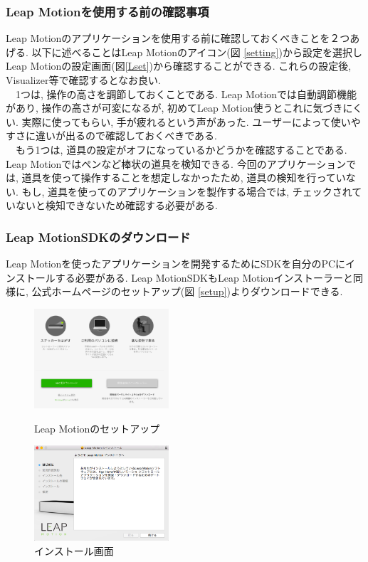 \documentclass{funthesis}
\begin{document}
\subsubsection{Leap Motionを使用する前の確認事項}
Leap Motionのアプリケーションを使用する前に確認しておくべきことを２つあげる. 以下に述べることはLeap Motionのアイコン(図 \ref{setting})から設定を選択しLeap Motionの設定画面(図\ref{Lset})から確認することができる. これらの設定後, Visualizer等で確認するとなお良い. \\
　1つは, 操作の高さを調節しておくことである. Leap Motionでは自動調節機能があり, 操作の高さが可変になるが, 初めてLeap Motion使うとこれに気づきにくい. 実際に使ってもらい, 手が疲れるという声があった. ユーザーによって使いやすさに違いが出るので確認しておくべきである. \\
　もう1つは, 道具の設定がオフになっているかどうかを確認することである. Leap Motionではペンなど棒状の道具を検知できる. 今回のアプリケーションでは, 道具を使って操作することを想定しなかったため, 道具の検知を行っていない. もし, 道具を使ってのアプリケーションを製作する場合では, チェックされていないと検知できないため確認する必要がある. \\

\subsubsection{Leap MotionSDKのダウンロード}
Leap Motionを使ったアプリケーションを開発するためにSDKを自分のPCにインストールする必要がある. Leap MotionSDKもLeap Motionインストーラーと同様に, 公式ホームページのセットアップ(図 \ref{setup})よりダウンロードできる. 


\begin{figure}[H]
 \begin{minipage}{0.5\hsize}
  \begin{center}
  \includegraphics[width=50mm]{./img/setup.png}
  \end{center}
  \caption{Leap Motionのセットアップ}
  \label{setup}
 \end{minipage}
 \begin{minipage}{0.5\hsize}
  \begin{center}
  \includegraphics[width=50mm]{./img/installer.png}
  \end{center}
  \caption{インストール画面}
  \label{install}
  \end{minipage}
\end{figure}
\end{document}
